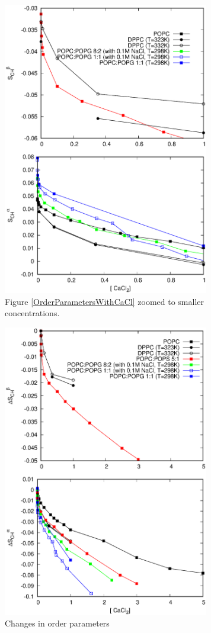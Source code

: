 \documentclass[aps,prl,superscriptaddress,twocolumn]{revtex4}
\begin{document}
\begin{figure}[]
  \centering
  \includegraphics[width=9.0cm]{../Figs/LIPIDSwithCaClBELOW1M.eps}
  \caption{\label{OrderParametersWithCaClBELOW1M}
    Figure \ref{OrderParametersWithCaCl} zoomed to smaller concentrations.
  }
\end{figure}
\begin{figure}[]
  \centering
  \includegraphics[width=9.0cm]{../Figs/CHANGESwithCaCl.eps}
  \caption{\label{OrderParameterCHANGESWithCaClBELOW1M}
    Changes in order parameters
  }
\end{figure}
\end{document}
